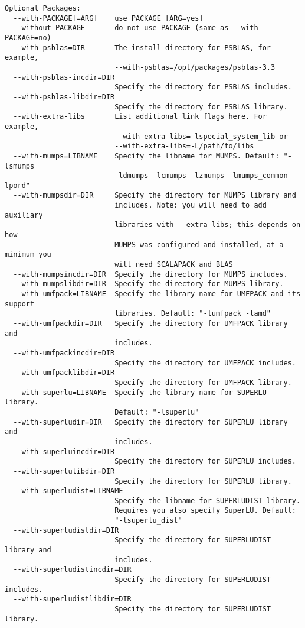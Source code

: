 \begin{verbatim}
Optional Packages:
  --with-PACKAGE[=ARG]    use PACKAGE [ARG=yes]
  --without-PACKAGE       do not use PACKAGE (same as --with-PACKAGE=no)
  --with-psblas=DIR       The install directory for PSBLAS, for example,
                          --with-psblas=/opt/packages/psblas-3.3
  --with-psblas-incdir=DIR
                          Specify the directory for PSBLAS includes.
  --with-psblas-libdir=DIR
                          Specify the directory for PSBLAS library.
  --with-extra-libs       List additional link flags here. For example,
                          --with-extra-libs=-lspecial_system_lib or
                          --with-extra-libs=-L/path/to/libs
  --with-mumps=LIBNAME    Specify the libname for MUMPS. Default: "-lsmumps
                          -ldmumps -lcmumps -lzmumps -lmumps_common -lpord"
  --with-mumpsdir=DIR     Specify the directory for MUMPS library and
                          includes. Note: you will need to add auxiliary
                          libraries with --extra-libs; this depends on how
                          MUMPS was configured and installed, at a minimum you
                          will need SCALAPACK and BLAS
  --with-mumpsincdir=DIR  Specify the directory for MUMPS includes.
  --with-mumpslibdir=DIR  Specify the directory for MUMPS library.
  --with-umfpack=LIBNAME  Specify the library name for UMFPACK and its support
                          libraries. Default: "-lumfpack -lamd"
  --with-umfpackdir=DIR   Specify the directory for UMFPACK library and
                          includes.
  --with-umfpackincdir=DIR
                          Specify the directory for UMFPACK includes.
  --with-umfpacklibdir=DIR
                          Specify the directory for UMFPACK library.
  --with-superlu=LIBNAME  Specify the library name for SUPERLU library.
                          Default: "-lsuperlu"
  --with-superludir=DIR   Specify the directory for SUPERLU library and
                          includes.
  --with-superluincdir=DIR
                          Specify the directory for SUPERLU includes.
  --with-superlulibdir=DIR
                          Specify the directory for SUPERLU library.
  --with-superludist=LIBNAME
                          Specify the libname for SUPERLUDIST library.
                          Requires you also specify SuperLU. Default:
                          "-lsuperlu_dist"
  --with-superludistdir=DIR
                          Specify the directory for SUPERLUDIST library and
                          includes.
  --with-superludistincdir=DIR
                          Specify the directory for SUPERLUDIST includes.
  --with-superludistlibdir=DIR
                          Specify the directory for SUPERLUDIST library.


\end{verbatim}
